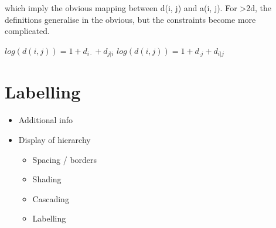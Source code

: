 \documentclass[letterpaper,oneside]{scrartcl}
\begin{document}
which imply the obvious mapping between d(i, j) and a(i, j).  For >2d,
the definitions generalise in the obvious, but the constraints become
more complicated.

$log(d(i,j)) = 1 + d_{i \cdot} + d_{j|i}$
$log(d(i,j)) = 1 + d_{\cdot j} + d_{i|j}$

\section{Labelling}
\label{sec:legends}

\begin{itemize}
  \item Additional info 
  
  \item Display of hierarchy
  \begin{itemize}
    \item Spacing / borders
    \item Shading
    \item Cascading
    \item Labelling
  \end{itemize}
\end{itemize}


\end{document}

